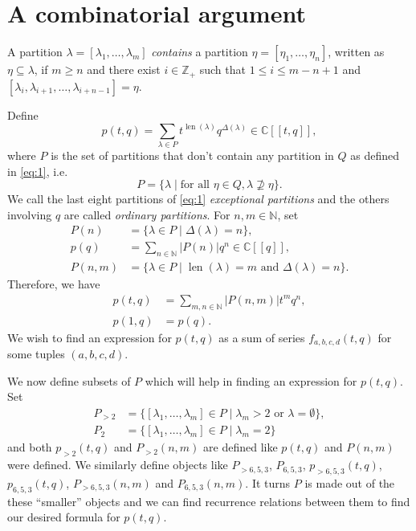 \documentclass[a4paper, 12pt, reqno]{amsart}
\theoremstyle{remark}
\DeclareMathOperator{\len}{len}
\begin{document}
\section{A combinatorial argument}
\label{sec:comb-argum}

A partition $\lambda = [\lambda_1, \dots, \lambda_m]$ \emph{contains} a partition $\eta = [\eta_1, \dots, \eta_n]$, written as $\eta \subseteq \lambda$, if $m \ge n$ and there exist $i \in \mathbb{Z}_+$ such that $1 \le i \le m - n + 1$ and $[\lambda_i, \lambda_{i + 1}, \dots, \lambda_{i + n - 1}] = \eta$.

Define
\begin{equation*}
  p(t, q) = \sum_{\lambda \in P}t^{\len(\lambda)}q^{\Delta(\lambda)} \in \mathbb{C}[[t, q]],
\end{equation*}
where $P$ is the set of partitions that don't contain any partition in $Q$ as defined in \eqref{eq:1}, i.e.\
\begin{equation*}
  P = \{\lambda \mid \text{for all }\eta \in Q, \lambda \nsupseteq \eta\}.
\end{equation*}
We call the last eight partitions of \eqref{eq:1} \emph{exceptional partitions} and the others involving $q$ are called \emph{ordinary partitions}.
For $n, m \in \mathbb{N}$, set
\begin{align*}
  P(n) &= \{\lambda \in P \mid \Delta(\lambda) = n\}, \\
  p(q) &= \sum_{n \in \mathbb{N}}|P(n)|q^n \in \mathbb{C}[[q]], \\
  P(n, m) &= \{\lambda \in P \mid \len(\lambda) = m\text{ and }\Delta(\lambda) = n\}.
\end{align*}
Therefore, we have
\begin{align*}
  p(t, q) &= \sum_{m, n \in \mathbb{N}}|P(n, m)|t^mq^n, \\
  p(1, q) &= p(q).
\end{align*}
We wish to find an expression for $p(t, q)$ as a sum of series $f_{a, b, c, d}(t, q)$ for some tuples $(a, b, c, d)$.

We now define subsets of $P$ which will help in finding an expression for $p(t, q)$.
Set
\begin{align*}
  P_{>2} &= \{[\lambda_1, \dots, \lambda_m] \in P \mid \lambda_m > 2\text{ or }\lambda = \emptyset\}, \\
  P_2 &= \{[\lambda_1, \dots, \lambda_m] \in P \mid \lambda_m = 2\}
\end{align*}
and both $p_{>2}(t, q)$ and $P_{>2}(n, m)$ are defined like $p(t, q)$ and $P(n, m)$ were defined.
We similarly define objects like $P_{>6, 5, 3}$, $P_{6, 5, 3}$, $p_{>6, 5, 3}(t, q)$, $p_{6, 5, 3}(t, q)$, $P_{>6, 5, 3}(n, m)$ and $P_{6, 5, 3}(n, m)$.
It turns $P$ is made out of the these ``smaller'' objects and we can find recurrence relations between them to find our desired formula for $p(t, q)$.
\end{document}
